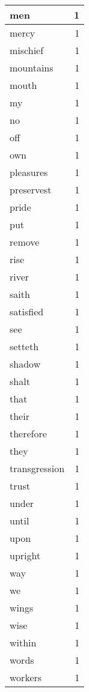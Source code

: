 \begin{center}
\begin{longtable}{l|r}
men & 1 \\ \hline
mercy & 1 \\ \hline
mischief & 1 \\ \hline
mountains & 1 \\ \hline
mouth & 1 \\ \hline
my & 1 \\ \hline
no & 1 \\ \hline
off & 1 \\ \hline
own & 1 \\ \hline
pleasures & 1 \\ \hline
preservest & 1 \\ \hline
pride & 1 \\ \hline
put & 1 \\ \hline
remove & 1 \\ \hline
rise & 1 \\ \hline
river & 1 \\ \hline
saith & 1 \\ \hline
satisfied & 1 \\ \hline
see & 1 \\ \hline
setteth & 1 \\ \hline
shadow & 1 \\ \hline
shalt & 1 \\ \hline
that & 1 \\ \hline
their & 1 \\ \hline
therefore & 1 \\ \hline
they & 1 \\ \hline
transgression & 1 \\ \hline
trust & 1 \\ \hline
under & 1 \\ \hline
until & 1 \\ \hline
upon & 1 \\ \hline
upright & 1 \\ \hline
way & 1 \\ \hline
we & 1 \\ \hline
wings & 1 \\ \hline
wise & 1 \\ \hline
within & 1 \\ \hline
words & 1 \\ \hline
workers & 1 \\ \hline
\end{longtable}
\end{center}



\normalsize